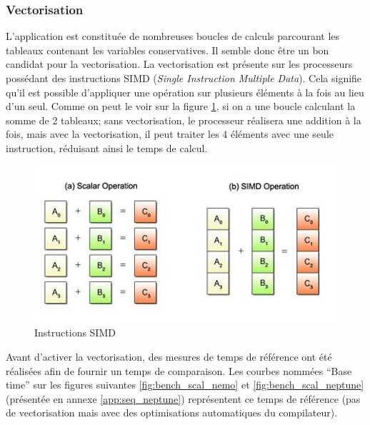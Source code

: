 \subsubsection{Vectorisation}\label{fig:vecto}
L'application est constituée de nombreuses boucles de calculs parcourant les tableaux contenant les variables conservatives. Il semble donc être un bon candidat pour la vectorisation. La vectorisation est présente sur les processeurs possédant des instructions SIMD (\textit{Single Instruction Multiple Data}). Cela signifie qu'il est possible d'appliquer une opération sur plusieurs éléments à la fois au lieu d'un seul. Comme on peut le voir sur la figure \ref{fig:simd}, si on a une boucle calculant la somme de 2 tableaux; sans vectorisation, le processeur réalisera une addition à la fois, mais avec la vectorisation, il peut traiter les 4 éléments avec une seule instruction, réduisant ainsi le temps de calcul.

\begin{figure}[ht]
  \centering
  \includegraphics[scale=0.85]{figures/simd.jpg}
  \caption{\label{fig:simd} Instructions SIMD}
\end{figure}


Avant d'activer la vectorisation, des mesures de temps de référence ont été réalisées afin de fournir un temps de comparaison. Les courbes nommées ``Base time'' sur les figures suivantes \ref{fig:bench_scal_nemo} et \ref{fig:bench_scal_neptune} (présentée en annexe \ref{app:seq_neptune}) représentent ce temps de référence (pas de vectorisation mais avec des optimisations automatiques du compilateur).

